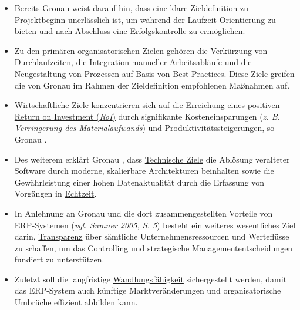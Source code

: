 \begin{itemize}
    \item Bereits Gronau \cite[286]{5} weist darauf hin, dass eine klare \uline{Zieldefinition} zu Projektbeginn unerlässlich ist, um während der Laufzeit Orientierung zu bieten und nach Abschluss eine Erfolgskontrolle zu ermöglichen.
    \item Zu den primären \uline{organisatorischen Zielen} gehören die Verkürzung von Durchlaufzeiten, die Integration manueller Arbeitsabläufe und die Neugestaltung von Prozessen auf Basis von \uline{Best Practices}. Diese Ziele greifen die von Gronau \cite[287]{6} im Rahmen der Zieldefinition empfohlenen Maßnahmen auf.
    \item \uline{Wirtschaftliche Ziele} konzentrieren sich auf die Erreichung eines positiven \uline{Return on Investment (\textit{\acs{RoI}})} durch signifikante Kosteneinsparungen (\textit{\acs{z. B.} Verringerung des Materialaufwands}) und Produktivitätssteigerungen, so Gronau \cite[62]{7}.
    \item Des weiterem erklärt Gronau \cite[80]{8}, dass \uline{Technische Ziele} die Ablösung veralteter Software durch moderne, skalierbare Architekturen beinhalten sowie die Gewährleistung einer hohen Datenaktualität durch die Erfassung von Vorgängen in \uline{Echtzeit}.
    \item In Anlehnung an Gronau \cite[13]{9} und die dort zusammengestellten Vorteile von \acs{ERP}‑Systemen (\textit{\acs{vgl.} Sumner 2005, \acs{S.} 5}) besteht ein weiteres wesentliches Ziel darin, \uline{Transparenz} über sämtliche Unternehmensressourcen und Werteflüsse zu schaffen, um das Controlling und strategische Managemententscheidungen fundiert zu unterstützen.
    \item Zuletzt soll die langfristige \uline{Wandlungsfähigkeit} sichergestellt werden, damit das \acs{ERP}-System auch künftige Marktveränderungen und organisatorische Umbrüche effizient abbilden kann.
\end{itemize}
